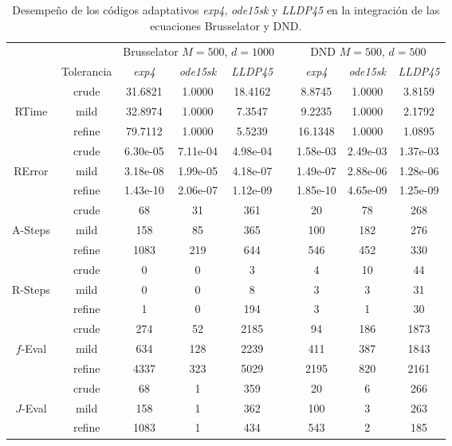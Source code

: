 \begin{table}[htb]
	\caption{Desempeño de los códigos  adaptativos \emph{exp4}, \emph{ode15sk} y \emph{LLDP45} en la integración de las ecuaciones Brusselator y DND.}
	\begin{adjustbox}{width=0.8\columnwidth,center}
\begin{tabular}{  ccccccccc }
    \hline
    & & \multicolumn{3}{c}{Brusselator $M=500$, $d=1000$ } & & \multicolumn{3}{c}{DND $M=500$, $d=500$}\\
    \cline{3-5} \cline{7-9}
    & Tolerancia & \emph{exp4} & \emph{ode15sk} & \emph{LLDP45} & & \emph{exp4} & \emph{ode15sk} & \emph{LLDP45} \\
    \hline
    & crude & 31.6821 & 1.0000 & 18.4162 &  & 8.8745 & 1.0000 & 3.8159 \\
    RTime & mild & 32.8974 & 1.0000 & 7.3547 &  & 9.2235 & 1.0000 & 2.1792 \\
    & refine & 79.7112 & 1.0000 & 5.5239 &  & 16.1348 & 1.0000 & 1.0895 \\
    \hline
    & crude & 6.30e-05 & 7.11e-04 & 4.98e-04 &  & 1.58e-03 & 2.49e-03 & 1.37e-03 \\
    RError & mild & 3.18e-08 & 1.99e-05 & 4.18e-07 &  & 1.49e-07 & 2.88e-06 & 1.28e-06 \\
    & refine & 1.43e-10 & 2.06e-07 & 1.12e-09 &  & 1.85e-10 & 4.65e-09 & 1.25e-09 \\
    \hline
    & crude & 68 & 31 & 361 &  & 20 & 78 & 268 \\
    A-Steps & mild & 158 & 85 & 365 &  & 100 & 182 & 276 \\
    & refine & 1083 & 219 & 644 &  & 546 & 452 & 330 \\
    \hline
    & crude & 0 & 0 & 3 &  & 4 & 10 & 44 \\
    R-Steps & mild & 0 & 0 & 8 &  & 3 & 3 & 31 \\
    & refine & 1 & 0 & 194 &  & 3 & 1 & 30 \\
    \hline
    & crude & 274 & 52 & 2185 &  & 94 & 186 & 1873 \\
    $f$-Eval & mild & 634 & 128 & 2239 &  & 411 & 387 & 1843 \\
    & refine & 4337 & 323 & 5029 &  & 2195 & 820 & 2161 \\
    \hline
     & crude & 68 & 1 & 359 &  & 20 & 6 & 266 \\
    $J$-Eval & mild & 158 & 1 & 362 &  & 100 & 3 & 263 \\
    & refine & 1083 & 1 & 434 &  & 543 & 2 & 185 \\

\end{tabular}
\end{adjustbox}
\end{table}
